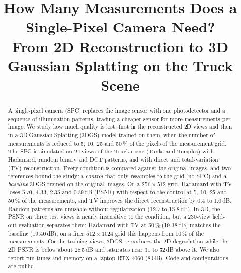 \documentclass[conference]{IEEEtran}
\begin{document}
\title{How Many Measurements Does a Single-Pixel Camera Need?\\
From 2D Reconstruction to 3D Gaussian Splatting on the Truck Scene}

\author{
\and
{}
}

\maketitle

\begin{abstract}
A single-pixel camera (SPC) replaces the image sensor with one photodetector and a sequence of illumination patterns,
trading a cheaper sensor for more measurements per image. We study how much quality is lost, first in the reconstructed
2D views and then in a 3D Gaussian Splatting (3DGS) model trained on them, when the number of measurements is reduced to
5, 10, 25 and 50\,\% of the pixels of the measurement grid. The SPC is simulated on 24 views of the Truck scene
(Tanks and Temples) with Hadamard, random binary and DCT patterns, and with direct and total-variation (TV)
reconstruction. Every condition is compared against the original images, and two references bound the study: a
\emph{control} that only resamples to the grid (no SPC) and a \emph{baseline} 3DGS trained on the original images.
On a $256\times512$ grid, Hadamard with TV loses 5.70, 4.33, 2.35 and 0.89\,dB (PSNR) with respect to the control at
5, 10, 25 and 50\,\% of the measurements, and TV improves the direct reconstruction by 0.4 to 1.0\,dB. Random patterns
are unusable without regularization (12.7 to 15.8\,dB). In 3D, the PSNR on three test views is nearly insensitive to
the condition, but a 230-view held-out evaluation separates them: Hadamard with TV at 50\,\% (19.38\,dB) matches the
baseline (19.40\,dB); on a finer $512\times1024$ grid this happens from 10\,\% of the measurements. On the training views, 3DGS
reproduces the 2D degradation while the 2D PSNR is below about 28.5\,dB and saturates near 31 to 32\,dB above it. We also report run
times and memory on a laptop RTX 4060 (8\,GB). Code and configurations are public.
\end{abstract}
\end{document}
